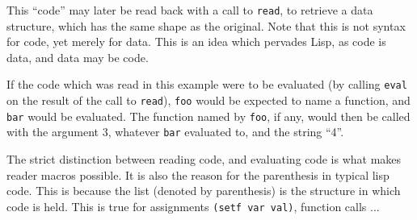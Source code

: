 \documentclass[11pt]{article}
\newcommand{\sym}[1]{\texttt{#1}}
\newcommand{\fun}[1]{\sym{#1}}
\begin{document}
This ``code'' may later be read back with a call to \fun{read}, to retrieve a
data structure, which has the same shape as the original.  Note that this is not
syntax for code, yet merely for data.  This is an idea which pervades Lisp, as
code is data, and data may be code.

If the code which was read in this example were to be evaluated (by calling
\fun{eval} on the result of the call to \fun{read}), \sym{foo} would be expected
to name a function, and \sym{bar} would be evaluated.  The function named by
\sym{foo}, if any, would then be called with the argument 3, whatever \sym{bar}
evaluated to, and the string ``4''.

The strict distinction between reading code, and evaluating code is what makes
reader macros possible.  It is also the reason for the parenthesis in typical
lisp code.  This is because the list (denoted by parenthesis) is the structure
in which code is held.  This is true for assignments \texttt{(setf var val)},
function calls ...
\end{document}
